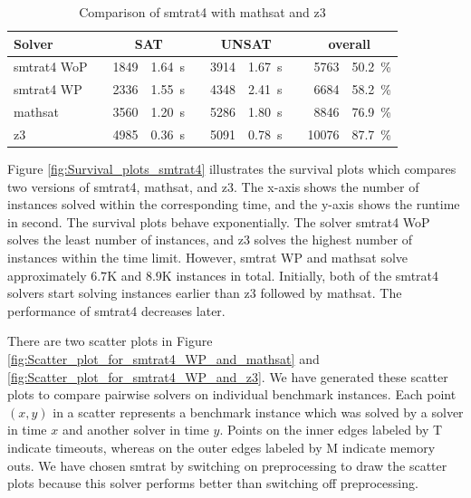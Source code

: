 \begin{table}[!ht]
    \caption{Comparison of smtrat4 with mathsat and z3}    
    \begin{tabularx}{\textwidth}{lXrrXrrXrr}
	\toprule
	\textbf{Solver}
	&& \multicolumn{2}{c}{\textbf{SAT}}
	&& \multicolumn{2}{c}{\textbf{UNSAT}}
	&& \multicolumn{2}{c}{\textbf{overall}}
	\\
	\midrule
	smtrat4 WoP
	&& 1849 & 1.64~s
	&& 3914 & 1.67~s
	&& 5763 & 50.2~\%
	\\
	smtrat4 WP
	&& 2336 & 1.55~s
	&& 4348 & 2.41~s
	&& 6684 & 58.2~\%
	\\
	mathsat
    	&& 3560 & 1.20~s
     	&& 5286 & 1.80~s
     	&& 8846 & 76.9~\%
	\\
	z3
	&& 4985 & 0.36~s
	&& 5091 & 0.78~s
	&& 10076 & 87.7~\%
	\\
	\bottomrule
\end{tabularx}
    \label{table:smtrat4_vs_mathsatAndZ3}
\end{table}

\noindent Figure \ref{fig:Survival_plots_smtrat4} illustrates the survival plots which compares two versions of smtrat4, mathsat, and z3.
The x-axis shows the number of instances solved within the corresponding time, and the y-axis shows the runtime in second.
The survival plots behave exponentially.
The solver smtrat4 WoP solves the least number of instances, and z3 solves the highest number of instances within the time limit.
However, smtrat WP and mathsat solve approximately $6.7$K and $8.9$K instances in total.
Initially, both of the smtrat4 solvers start solving instances earlier than z3 followed by mathsat.
The performance of smtrat4 decreases later.\newline

\noindent There are two scatter plots in Figure \ref{fig:Scatter_plot_for_smtrat4_WP_and_mathsat} and \ref{fig:Scatter_plot_for_smtrat4_WP_and_z3}.
We have generated these scatter plots to compare pairwise solvers on individual benchmark instances.
Each point $(x, y)$ in a scatter represents a benchmark instance which was solved by a solver in time $x$ and another solver in time $y$.
Points on the inner edges labeled by T indicate timeouts, whereas on the outer edges labeled by M indicate memory outs.
We have chosen smtrat by switching on preprocessing to draw the scatter plots because this solver performs better than switching off preprocessing.\newline

